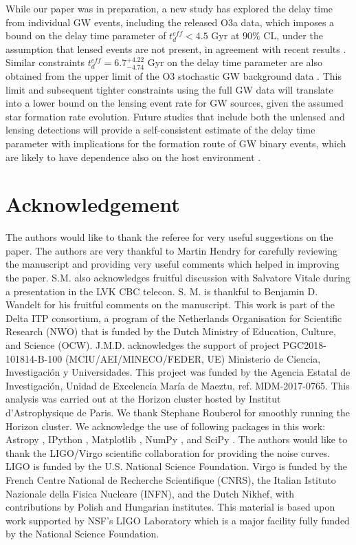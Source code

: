 \documentclass[a4paper,useAMS,usenatbib]{mnras}
\begin{document}
While our paper was in preparation, a new study  \citep{Fishbach:2021mhp} has explored the delay time from individual GW events, including the released O3a data, which imposes a bound on the delay time parameter of $t_d^{eff}<4.5$ Gyr at $90\%$ CL, under the assumption that lensed events are not present, in agreement with recent results \citep{Abbott:2021iab}. Similar constraints $t_d^{eff}= 6.7_{-4.74}^{+4.22}$ Gyr on the delay time parameter are also obtained from the upper limit of the O3  stochastic GW background data \citep{Mukherjee:2021ags}. This limit and subsequent tighter constraints using the full GW data will translate into a lower bound on the lensing event rate for GW sources, given the assumed star formation rate evolution. Future studies that include both the unlensed and lensing detections will provide a self-consistent estimate of the delay time parameter with implications for the formation route of GW binary events, which are likely to have dependence also on the host environment \citep{2010ApJ...716..615O,2010MNRAS.402..371B, 2012ApJ...759...52D, Dominik:2014yma, Lamberts:2016txh, Elbert:2017sbr, Eldridge:2018nop, Buisson:2020hoq, Santoliquido:2020axb}.


\section*{Acknowledgement}
 {The authors would like to thank the referee for very useful suggestions on the paper.} The authors are very thankful to Martin Hendry for carefully reviewing the manuscript and providing very useful comments which helped in improving the paper. S.M. also acknowledges fruitful discussion with Salvatore Vitale during a presentation in the LVK CBC telecon. S. M. is thankful to Benjamin D. Wandelt for his fruitful comments on the manuscript. 
This work is part of the Delta ITP consortium, a program of the Netherlands Organisation for Scientific Research (NWO) that is funded by the Dutch Ministry of Education, Culture, and Science (OCW). J.M.D. acknowledges the support of project PGC2018-101814-B-100 (MCIU/AEI/MINECO/FEDER, UE) Ministerio de Ciencia, Investigaci\'on y Universidades.  This project was funded by the Agencia Estatal de Investigaci\'on, Unidad de Excelencia Mar\'ia de Maeztu, ref. MDM-2017-0765.   This analysis was carried out at the Horizon cluster hosted by Institut d'Astrophysique de Paris. We thank Stephane Rouberol for smoothly running the Horizon cluster. We acknowledge the use of following packages in this work: Astropy \citep{2013A&A...558A..33A,2018AJ....156..123A}, IPython \citep{PER-GRA:2007}, Matplotlib \citep{Hunter:2007},  NumPy \citep{2011CSE....13b..22V}, and SciPy \citep{scipy}. The authors would like to thank the  LIGO/Virgo scientific collaboration for providing the noise curves. LIGO is funded by the U.S. National Science Foundation. Virgo is funded by the French Centre National de Recherche Scientifique (CNRS), the Italian Istituto Nazionale della Fisica Nucleare (INFN), and the Dutch Nikhef, with contributions by Polish and Hungarian institutes. This material is based upon work supported by NSF’s LIGO Laboratory which is a major facility fully funded by the National Science Foundation.
\end{document}
